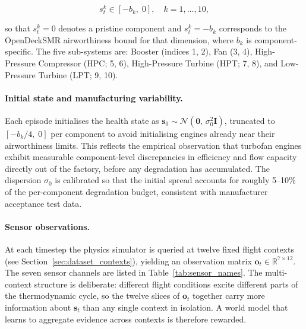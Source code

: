 \begin{equation}
  s_t^k \in [-b_k,\; 0], \quad k = 1, \ldots, 10,
\end{equation}

so that $s_t^k = 0$ denotes a pristine component and $s_t^k = -b_k$
corresponds to the OpenDeckSMR airworthiness bound for that dimension,
where $b_k$ is component-specific.
The five sub-systems are: Booster (indices 1, 2), Fan (3, 4),
High-Pressure Compressor (HPC; 5, 6), High-Pressure Turbine (HPT; 7, 8),
and Low-Pressure Turbine (LPT; 9, 10).

\paragraph{Initial state and manufacturing variability.}
Each episode initialises the health state as
$\mathbf{s}_0 \sim \mathcal{N}(\mathbf{0},\, \sigma_0^2\mathbf{I})$,
truncated to $[-b_k/4,\; 0]$ per component to avoid initialising
engines already near their airworthiness limits.
This reflects the empirical observation that turbofan engines exhibit
measurable component-level discrepancies in efficiency and flow capacity
directly out of the factory, before any degradation has accumulated.
The dispersion $\sigma_0$ is calibrated so that the initial spread
accounts for roughly 5–10\% of the per-component degradation budget,
consistent with manufacturer acceptance test data.

\paragraph{Sensor observations.}
At each timestep the physics simulator is queried at twelve fixed flight
contexts (see Section~\ref{sec:dataset_contexts}), yielding an observation
matrix $\mathbf{o}_t \in \mathbb{R}^{7 \times 12}$.
The seven sensor channels are listed in
Table~\ref{tab:sensor_names}. The multi-context structure is deliberate:
different flight conditions excite different parts of the thermodynamic
cycle, so the twelve slices of $\mathbf{o}_t$ together carry more
information about $\mathbf{s}_t$ than any single context in isolation.
A world model that learns to aggregate evidence across contexts is
therefore rewarded.

